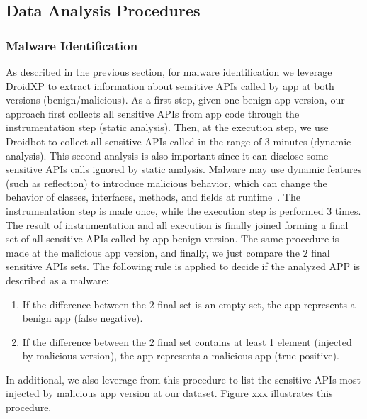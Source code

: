 
\subsection{Data Analysis Procedures} \label{sec:dataAnalysisProc}

\subsubsection{Malware Identification} \label{sec:malwaresetup}
As described in the previous section, for malware identification we leverage DroidXP to extract information about sensitive APIs called by app at both versions (benign/malicious). As a first step, given one benign app version, our approach first collects all sensitive APIs from app code through the instrumentation step (static analysis). Then, at the execution step, we use Droidbot to collect all sensitive APIs called in the range of $3$ minutes (dynamic analysis). This second analysis is also important since it can disclose some sensitive APIs calls ignored by static analysis. Malware may use dynamic features (such as reflection) to introduce malicious behavior, which can change the behavior of classes, interfaces, methods, and fields at runtime~\cite{DBLP:journals/spe/ZhangLTX18,DBLP:journals/tosem/LiTX19}. The instrumentation step is made once, while the execution step is performed $3$ times. The result of instrumentation and all execution is finally joined forming a final set of all sensitive APIs called by app benign version. The same procedure is made at the malicious app version, and finally, we just compare the $2$ final sensitive APIs sets. The following rule is applied to decide if the analyzed APP is described as a malware:

\begin{enumerate}
    \item If the difference between the $2$ final set is an empty set, the app represents a benign app (false negative).
    \item If the difference between the $2$ final set contains at least 1 element (injected by malicious version), the app represents a malicious app (true positive).
\end{enumerate}

In additional, we also leverage from this procedure to list the sensitive APIs most injected by malicious app version at our dataset. Figure xxx illustrates this procedure.

